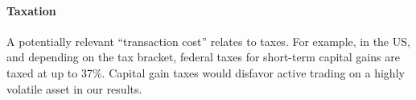 \paragraph{Taxation} A potentially relevant “transaction cost” relates to taxes.
For example, in the US, and depending on the tax bracket, federal taxes for
short-term capital gains are taxed at up to 37\%\footnotemark . Capital gain taxes would
disfavor active trading on a highly volatile asset in our results.

